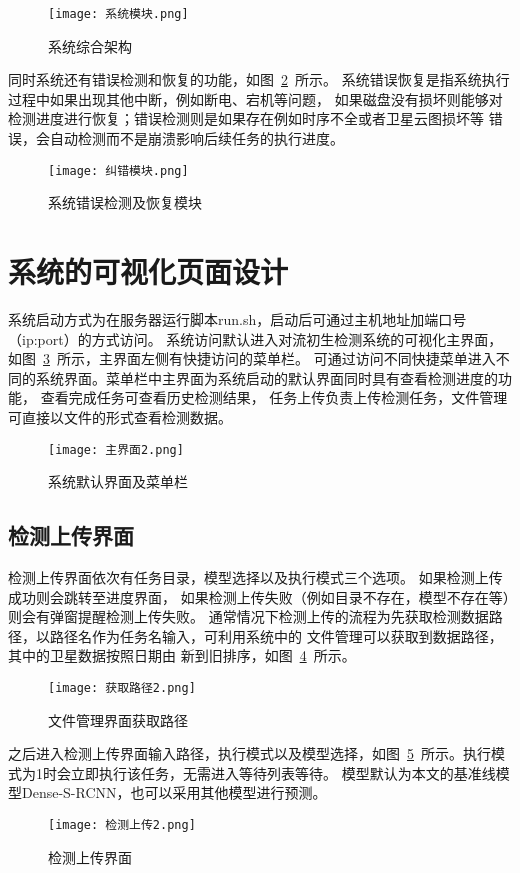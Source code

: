 \begin{figure}[h]
	\centering
	\texttt{[image: 系统模块.png]}
	\caption{系统综合架构}
	\label{fig:system1}
\end{figure}

同时系统还有错误检测和恢复的功能，如图~\ref{fig:err}~所示。
系统错误恢复是指系统执行过程中如果出现其他中断，例如断电、宕机等问题，
如果磁盘没有损坏则能够对检测进度进行恢复；错误检测则是如果存在例如时序不全或者卫星云图损坏等
错误，会自动检测而不是崩溃影响后续任务的执行进度。

\begin{figure}[h]
	\centering
	\texttt{[image: 纠错模块.png]}
	\caption{系统错误检测及恢复模块}
	\label{fig:err}
\end{figure}

\section{系统的可视化页面设计}
系统启动方式为在服务器运行脚本run.sh，启动后可通过主机地址加端口号（ip:port）的方式访问。
系统访问默认进入对流初生检测系统的可视化主界面，如图~\ref{fig:sys-main}~所示，主界面左侧有快捷访问的菜单栏。
可通过访问不同快捷菜单进入不同的系统界面。菜单栏中主界面为系统启动的默认界面同时具有查看检测进度的功能，
查看完成任务可查看历史检测结果，
任务上传负责上传检测任务，文件管理可直接以文件的形式查看检测数据。
\begin{figure}[h]
	\centering
	\texttt{[image: 主界面2.png]}
	\caption{系统默认界面及菜单栏}
	\label{fig:sys-main}
\end{figure}

\subsection{检测上传界面}
检测上传界面依次有任务目录，模型选择以及执行模式三个选项。
如果检测上传成功则会跳转至进度界面，
如果检测上传失败（例如目录不存在，模型不存在等）则会有弹窗提醒检测上传失败。
通常情况下检测上传的流程为先获取检测数据路径，以路径名作为任务名输入，可利用系统中的
文件管理可以获取到数据路径，其中的卫星数据按照日期由
新到旧排序，如图~\ref{fig:sys-getpath}~所示。
\begin{figure}[h]
	\centering
	\texttt{[image: 获取路径2.png]}
	\caption{文件管理界面获取路径}
	\label{fig:sys-getpath}
\end{figure}

之后进入检测上传界面输入路径，执行模式以及模型选择，如图~\ref{fig:sys-missupload}~所示。执行模式为1时会立即执行该任务，无需进入等待列表等待。
模型默认为本文的基准线模型Dense-S-RCNN，也可以采用其他模型进行预测。
\begin{figure}[h]
	\centering
	\texttt{[image: 检测上传2.png]}
	\caption{检测上传界面}
	\label{fig:sys-missupload}
\end{figure}

